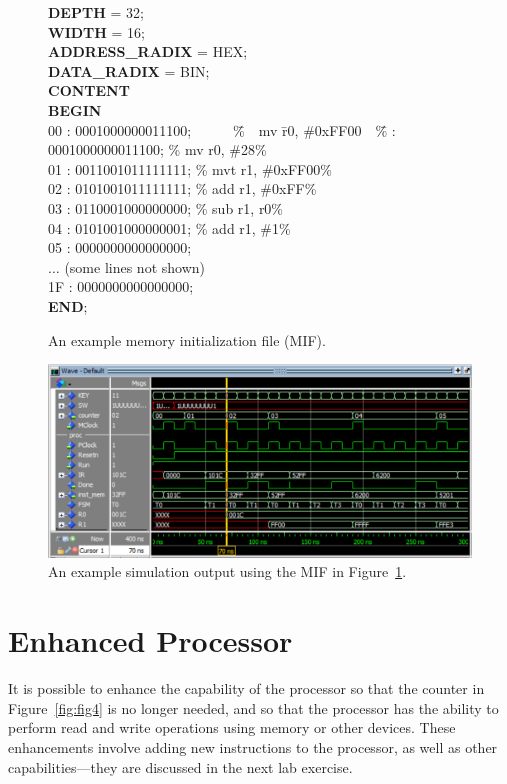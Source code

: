 \documentclass[epsfig,10pt,fullpage]{article}
\begin{document}
\begin{figure}[H]
\begin{center}
\begin{minipage}[t]{12.5 cm}
\begin{tabbing}
{\bf DEPTH} = 32;\\
{\bf WIDTH} = 16;\\
{\bf ADDRESS\_RADIX} = HEX;\\
{\bf DATA\_RADIX} = BIN;\\
{\bf CONTENT}\\
{\bf BEGIN}\\
00	:	0001000000011100;~~~~~~\=\%~~mv  \=r0, \#0xFF00~~\=\% 	:	0001000000011100;	\>\% mv \>r0, \#28\>\%\\
01	:	0011001011111111; \>\% mvt \>r1, \#0xFF00\>\%\\
02	:	0101001011111111;	\>\% add  \>r1, \#0xFF\>\%\\
03	:	0110001000000000;	\>\% sub  \>r1, r0\>\%\\
04	:	0101001000000001;	\>\% add  \>r1, \#1\>\%\\
05	:	0000000000000000;\\
$\ldots$ (some lines not shown)\\
1F :	0000000000000000;\\
{\bf END};
\end{tabbing}
\end{minipage}
\end{center}
\caption{An example memory initialization file (MIF).}
\label{fig:fig_MIF}
\end{figure}

\begin{figure}[H]
	\begin{center}
		\includegraphics[scale=.95]{figures/figure8.png}
	\end{center}
	\caption{An example simulation output using the MIF in Figure~\ref{fig:fig_MIF}.}
	\label{fig:fig_sim2}
\end{figure}

\section*{Enhanced Processor}
It is possible to enhance the capability of the processor so that the counter in 
Figure~\ref{fig:fig4} is no longer needed, and so that the processor has the ability to 
perform read and write operations using memory or other devices. These enhancements involve 
adding new instructions to the processor, as well as other capabilities---they are
discussed in the next lab exercise.
\end{document}
